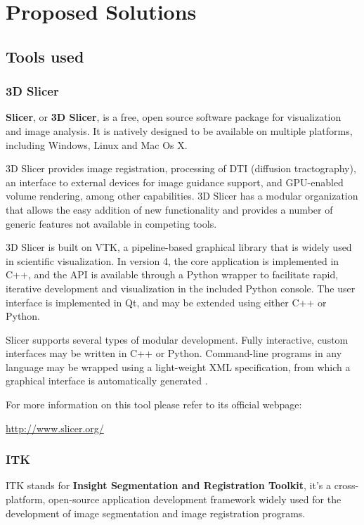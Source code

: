 \chapter{Proposed Solutions}

\section{Tools used}
\subsection{3D Slicer}
\textbf{Slicer}, or \textbf{3D Slicer}, is a free, open source software package for visualization and image analysis. It is natively designed to be available on multiple platforms, including Windows, Linux and Mac Os X.

3D Slicer provides image registration, processing of DTI (diffusion tractography), an interface to external devices for image guidance support, and GPU-enabled volume rendering, among other capabilities. 3D Slicer has a modular organization that allows the easy addition of new functionality and provides a number of generic features not available in competing tools.

3D Slicer is built on VTK, a pipeline-based graphical library that is widely used in scientific visualization. In version 4, the core application is implemented in C++, and the API is available through a Python wrapper to facilitate rapid, iterative development and visualization in the included Python console. The user interface is implemented in Qt, and may be extended using either C++ or Python.

Slicer supports several types of modular development. Fully interactive, custom interfaces may be written in C++ or Python. Command-line programs in any language may be wrapped using a light-weight XML specification, from which a graphical interface is automatically generated \cite{slicer}.

For more information on this tool please refer to its official webpage: 

\url{http://www.slicer.org/}

\subsection{ITK}
ITK stands for \textbf{Insight Segmentation and Registration Toolkit}, it's a cross-platform, open-source application development framework widely used for the development of image segmentation and image registration programs.

